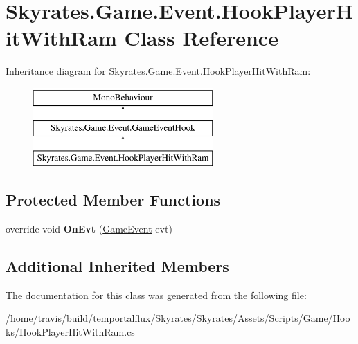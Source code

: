 \hypertarget{class_skyrates_1_1_game_1_1_event_1_1_hook_player_hit_with_ram}{\section{Skyrates.\-Game.\-Event.\-Hook\-Player\-Hit\-With\-Ram Class Reference}
\label{class_skyrates_1_1_game_1_1_event_1_1_hook_player_hit_with_ram}
}
Inheritance diagram for Skyrates.\-Game.\-Event.\-Hook\-Player\-Hit\-With\-Ram\-:\begin{figure}[H]
\begin{center}
\leavevmode
\includegraphics[height=3.000000cm]{class_skyrates_1_1_game_1_1_event_1_1_hook_player_hit_with_ram}
\end{center}
\end{figure}
\subsection*{Protected Member Functions}
\begin{DoxyCompactItemize}
\item 
\hypertarget{class_skyrates_1_1_game_1_1_event_1_1_hook_player_hit_with_ram_a386283a3cbd494cd2fcccc757e004d82}{override void {\bfseries On\-Evt} (\hyperlink{class_skyrates_1_1_game_1_1_event_1_1_game_event}{Game\-Event} evt)}\label{class_skyrates_1_1_game_1_1_event_1_1_hook_player_hit_with_ram_a386283a3cbd494cd2fcccc757e004d82}

\end{DoxyCompactItemize}
\subsection*{Additional Inherited Members}


The documentation for this class was generated from the following file\-:\begin{DoxyCompactItemize}
\item 
/home/travis/build/temportalflux/\-Skyrates/\-Skyrates/\-Assets/\-Scripts/\-Game/\-Hooks/Hook\-Player\-Hit\-With\-Ram.\-cs\end{DoxyCompactItemize}
